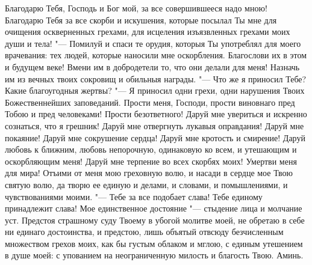\mychapterending

 


Благодарю Тебя, Господь и Бог мой, за все совершившееся надо мною! Благодарю Тебя за все скорби и искушения, которые посылал Ты мне для очищения оскверненных грехами, для исцеления изъязвленных грехами моих души и тела! "--- Помилуй и спаси те орудия, которыя Ты употреблял для моего врачевания: тех людей, которые наносили мне оскорбления. Благослови их в этом и будущем веке! Вмени им в добродетели то, что они делали для меня! Назначь им из вечных твоих сокровищ и обильныя награды. "--- Что же я приносил Тебе? Какие благоугодныя жертвы? "--- Я приносил одни грехи, одни нарушения Твоих Божественнейших заповеданий. Прости меня, Господи, прости виновнаго пред Тобою и пред человеками! Прости безответного! Даруй мне увериться и искренно сознаться, что я грешник! Даруй мне отвергнуть лукавыя оправдания! Даруй мне покаяние! Даруй мне сокрушение сердца! Даруй мне кротость и смирение! Даруй любовь к ближним, любовь непорочную, одинаковую ко всем, и утешающим и оскорбляющим меня! Даруй мне терпение во всех скорбях моих! Умертви меня для мира! Отъими от меня мою греховную волю, и насади в сердце мое Твою святую волю, да творю ее единую и делами, и словами, и помышлениями, и чувствованиями моими. "--- Тебе за все подобает слава! Тебе единому принадлежит слава! Мое единственное достояние "--- стыдение лица и молчание уст. Предстоя страшному суду Твоему в убогой молитве моей, не обретаю в себе ни единаго достоинства, и предстою, лишь объятый отвсюду безчисленным множеством грехов моих, как бы густым облаком и мглою, с единым утешением в душе моей: с упованием на неограниченную милость и благость Твою. Аминь.


\mychapterending